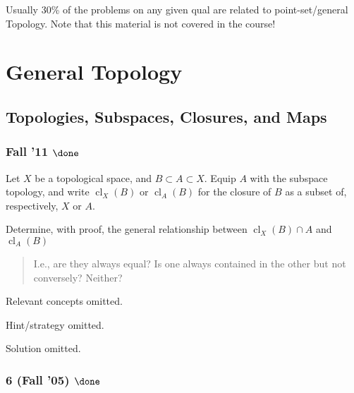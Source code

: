 \begin{warnings}

Usually 30\% of the problems on any given qual are related to
point-set/general Topology. Note that this material is not covered in
the course!

\end{warnings}

\hypertarget{general-topology}{%
\section{General Topology}\label{general-topology}}

\hypertarget{topologies-subspaces-closures-and-maps}{%
\subsection{Topologies, Subspaces, Closures, and
Maps}\label{topologies-subspaces-closures-and-maps}}

\hypertarget{fall-11-done}{%
\subsubsection{\texorpdfstring{Fall '11
\(\done\)}{Fall '11 \textbackslash done}}\label{fall-11-done}}

\begin{problem}[Fall 2011]

Let \(X\) be a topological space, and \(B \subset A \subset X\). Equip
\(A\) with the subspace topology, and write
\({ \operatorname{cl}} _X (B)\) or \({ \operatorname{cl}} _A (B)\) for
the closure of \(B\) as a subset of, respectively, \(X\) or \(A\).

Determine, with proof, the general relationship between
\({ \operatorname{cl}} _X (B) \cap A\) and
\({ \operatorname{cl}} _A (B)\)

\begin{quote}
I.e., are they always equal? Is one always contained in the other but
not conversely? Neither?
\end{quote}

\end{problem}

Relevant concepts omitted.

Hint/strategy omitted.

Solution omitted.

\hypertarget{fall-05-done}{%
\subsubsection{\texorpdfstring{6 (Fall '05)
\(\done\)}{6 (Fall '05) \textbackslash done}}\label{fall-05-done}}

